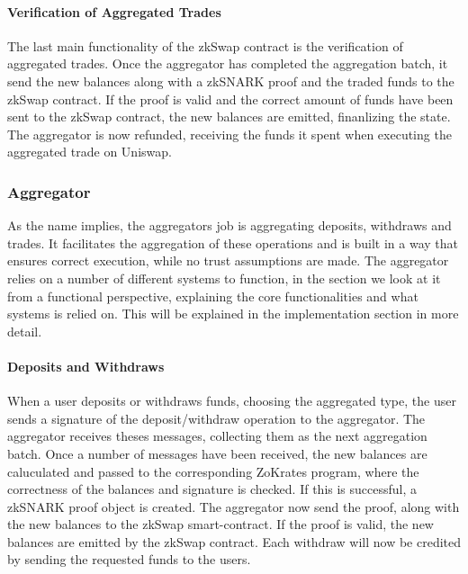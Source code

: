 \documentclass[../../thesis.tex]{subfiles}
\begin{document}
\paragraph{Verification of Aggregated Trades}
The last main functionality of the zkSwap contract is the verification of aggregated trades. Once the aggregator has completed the aggregation batch, it send the new balances along with a zkSNARK proof and the traded funds to the zkSwap contract. If the proof is valid and the correct amount of funds have been sent to the zkSwap contract, the new balances are emitted, finanlizing the state. The aggregator is now refunded, receiving the funds it spent when executing the aggregated trade on Uniswap.

\subsubsection{Aggregator}
As the name implies, the aggregators job is aggregating deposits, withdraws and trades. It facilitates the aggregation of these operations and is built in a way that ensures correct execution, while no trust assumptions are made. The aggregator relies on a number of different systems to function, in the section we look at it from a functional perspective, explaining the core functionalities and what systems is relied on. This will be explained in the implementation section in more detail.
\paragraph{Deposits and Withdraws}
When a user deposits or withdraws funds, choosing the aggregated type, the user sends a signature of the deposit/withdraw operation to the aggregator. The aggregator receives theses messages, collecting them as the next aggregation batch. Once a number of messages have been received, the new balances are caluculated and passed to the corresponding ZoKrates program, where the correctness of the balances and signature is checked. If this is successful, a zkSNARK proof object is created. The aggregator now send the proof, along with the new balances to the zkSwap smart-contract. If the proof is valid, the new balances are emitted by the zkSwap contract. Each withdraw will now be credited by sending the requested funds to the users. 
\end{document}
